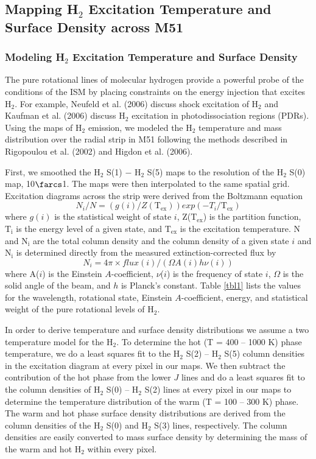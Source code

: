 \documentclass[12pt,preprint]{aastex}
\begin{document}
\subsection{Mapping H$_2$ Excitation Temperature and Surface Density across M51}

\subsubsection{Modeling H$_2$ Excitation Temperature and Surface Density}

The pure rotational lines of molecular hydrogen provide a powerful
probe of the conditions of the ISM by placing constraints on the
energy injection that excites H$_2$.  For example, 
Neufeld et al. (2006) discuss shock excitation of H$_2$ and 
Kaufman et al. (2006) discuss H$_2$ excitation in photodissociation regions (PDRs).  
Using the maps of H$_2$ emission, we modeled the H$_2$ 
temperature and mass distribution over the radial strip in M51 
following the methods described in Rigopoulou et al. (2002) 
and Higdon et al. (2006).

First, we smoothed the H$_2$ S(1) $-$ H$_2$ S(5)
maps to the resolution of the H$_2$ S(0) map, 10$\farcs$1.
The maps were then interpolated to the same spatial grid.  Excitation
diagrams across the strip were derived from the Boltzmann equation
\begin{equation}
N_i/N = (g(i)/Z(\mathrm{T_{ex}}))exp(-T_i/\mathrm{T_{ex}})
\end{equation}
where $g(i)$ is the statistical weight of state $i$,
Z($\mathrm{T_{ex}}$) is the partition function, $\mathrm{T_i}$ is the
energy level of a given state, and $\mathrm{T_{ex}}$ is the excitation
temperature.  N and $\mathrm{N_i}$ are the total column density and
the column density of a given state $i$ and $\mathrm{N_i}$ is
determined directly from the measured extinction-corrected flux by
\begin{equation}
N_i = 4 \pi \times flux(i)/(\Omega A(i)h\nu (i))
\end{equation}
where A($i$) is the Einstein $A$-coefficient, $\nu$($i$) is the
frequency of state $i$, $\Omega$ is the solid angle of the beam, and
$h$ is Planck's constant.  Table \ref{tbl1} lists the values for the
wavelength, rotational state, Einstein $A$-coefficient, energy, and
statistical weight of the pure rotational levels of H$_2$.

In order to derive temperature and surface density 
distributions we assume a two temperature model for the 
H$_2$.  To determine the hot (T = 400 -- 1000 K) 
phase temperature, we do a least squares fit 
to the H$_2$ S(2) -- H$_2$ S(5) column densities in the 
excitation diagram at every pixel in our maps.   
We then subtract the contribution of the hot phase from the lower $J$ 
lines and do a least squares fit to the column densities of 
H$_2$ S(0) -- H$_2$ S(2) lines at every pixel in our 
maps to determine the temperature distribution 
of the warm (T = 100 -- 300 K) phase.  The warm and hot 
phase surface density distributions are derived from the 
column densities of the H$_2$ S(0) and H$_2$ S(3) lines, 
respectively.  The column densities are easily converted 
to mass surface density by determining the mass of the 
warm and hot H$_2$ within every pixel. 
\end{document}
